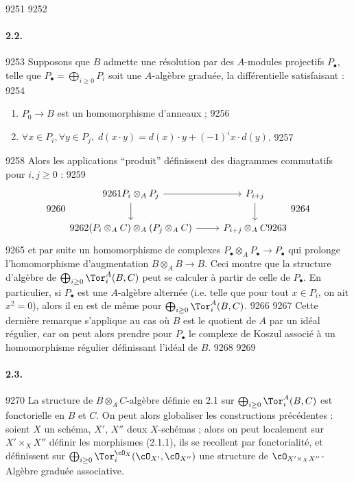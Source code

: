   9251	
  9252	\paragraph{2.2.}
  9253	Supposons que $B$ admette une r\'esolution par des $A$-modules projectifs $P_{\bullet}$, telle que $P_{\bullet} = \bigoplus_{i \geq 0} P_i$ soit une $A$-alg\`ebre gradu\'ee, la diff\'erentielle satisfaisant :
  9254	\begin{enumerate}[label=\alph*)]
  9255	\item $P_0 \to B$ est un homomorphisme d'anneaux ;
  9256	\item $\forall x \in P_i, \forall y \in P_j, \; d(x \cdot y) = d(x) \cdot y + (-1)^i x \cdot d(y)$.
  9257	\end{enumerate}
  9258	Alors les applications ``produit'' d\'efinissent des diagrammes commutatifs pour $i,j \geq 0$ :
  9259	\[
  9260	\begin{tikzcd}
  9261	P_i \otimes_A P_j \arrow[r] \arrow[d] & P_{i+j} \arrow[d] \\
  9262	(P_i \otimes_A C) \otimes_A (P_j \otimes_A C) \arrow[r] & P_{i+j} \otimes_A C
  9263	\end{tikzcd}
  9264	\]
  9265	et par suite un homomorphisme de complexes $P_{\bullet} \otimes_A P_{\bullet} \to P_{\bullet}$ qui prolonge l'homomorphisme d'augmentation $B \otimes_A B \to B$. Ceci montre que la structure d'alg\`ebre de $\bigoplus_{i \geq 0} \Tor_i^A(B,C)$ peut se calculer \`a partir de celle de $P_{\bullet}$. En particulier, si $P_{\bullet}$ est une $A$-alg\`ebre altern\'ee (i.e. telle que pour tout $x \in P_i$, on ait $x^2 = 0$), alors il en est de m\^eme pour $\bigoplus_{i \geq 0} \Tor_i^A(B,C)$.
  9266	
  9267	Cette derni\`ere remarque s'applique au cas o\`u $B$ est le quotient de $A$ par un id\'eal r\'egulier, car on peut alors prendre pour $P_{\bullet}$ le complexe de Koszul associ\'e \`a un homomorphisme r\'egulier d\'efinissant l'id\'eal de $B$.
  9268	
  9269	\paragraph{2.3.}
  9270	La structure de $B \otimes_A C$-alg\`ebre d\'efinie en 2.1 sur $\bigoplus_{i \geq 0} \Tor_i^A(B,C)$ est fonctorielle en $B$ et $C$. On peut alors globaliser les constructions pr\'ec\'edentes : soient $X$ un sch\'ema, $X'$, $X''$ deux $X$-sch\'emas ; alors on peut localement sur $X' \times_X X''$ d\'efinir les morphismes (2.1.1), ils se recollent par fonctorialit\'e, et d\'efinissent sur $\bigoplus_{i \geq 0} \Tor_i^{\cO_X}(\cO_{X'}, \cO_{X''})$ une structure de $\cO_{X' \times_X X''}$-Alg\`ebre gradu\'ee associative.
